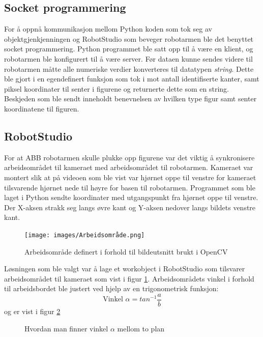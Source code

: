 \documentclass[conference]{IEEEtran}
\begin{document}
    \subsection{Socket programmering}
        For å oppnå kommunikasjon mellom Python koden som tok seg av objektgjenkjenningen og RobotStudio som beveger robotarmen ble det benyttet socket programmering. Python programmet ble satt opp til å være en klient, og robotarmen ble konfigurert til å være server. Før dataen kunne sendes videre til robotarmen måtte alle numeriske verdier konverteres til datatypen \textit{string}.  Dette ble gjort i en egendefinert funksjon som tok i mot antall identifiserte kanter, samt piksel koordinater til senter i figurene og returnerte dette som en string. Beskjeden som ble sendt inneholdt benevnelsen av hvilken type figur samt senter koordinatene til figuren.

    \subsection{RobotStudio}
        For at ABB robotarmen skulle plukke opp figurene var det viktig å synkronisere arbeidsområdet til kameraet med arbeidsområdet til robotarmen. 
        Kameraet var montert slik at på videoen som ble vist var hjørnet oppe til venstre for kameraet tilsvarende hjørnet nede til høyre for basen til robotarmen. Programmet som ble laget i Python sendte koordinater med utgangspunkt fra hjørnet oppe til venstre. Der X-aksen strakk seg langs øvre kant og Y-aksen nedover langs bildets venstre kant.

       \begin{figure}[!htb]
            \centering
                \texttt{[image: images/Arbeidsområde.png]}
            \caption{Arbeidsområde definert i forhold til bildeutsnitt brukt i OpenCV}
            \label{fig:robotstudio}
        \end{figure}

        Løsningen som ble valgt var å lage et workobject i RobotStudio som tilsvarer arbeidsområdet til kameraet som vist i figur \ref{fig:robotstudio}. Arbeidsområdets vinkel i forhold til arbeidsbordet ble justert ved hjelp av en trigonometrisk funksjon:
        \begin{equation*}
            \text{Vinkel } \alpha = tan^{-1}\frac{a}{b}
        \end{equation*}
        og er vist i figur \ref{fig:trig}

        \begin{figure}[!htb]
            \caption{Hvordan man finner vinkel $\alpha$ mellom to plan}
            \label{fig:trig}
        \end{figure}
    
\end{document}
